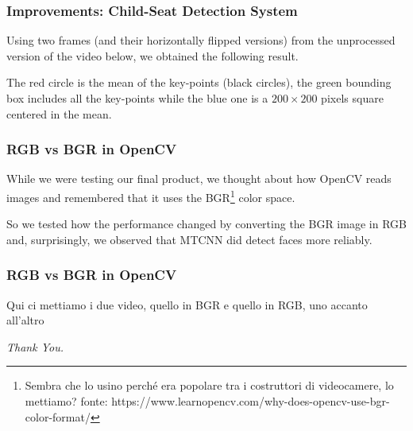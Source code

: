 \documentclass{beamer}
\begin{document}
	\begin{frame}
		\frametitle{Improvements: Child-Seat Detection System}
		Using two frames (and their horizontally flipped versions) from the unprocessed version of the video below, we obtained the following result.
		
		\bigskip
		
		
		The red circle is the mean of the key-points (black circles), the green bounding box includes all the key-points while the blue one is a $200 \times 200$ pixels square centered in the mean.
	\end{frame}

	\begin{frame}
		\frametitle{RGB vs BGR in OpenCV}
		
		While we were testing our final product, we thought about how OpenCV reads images and remembered that it uses the BGR\footnote{Sembra che lo usino perché era popolare tra i costruttori di videocamere, lo mettiamo? fonte: https://www.learnopencv.com/why-does-opencv-use-bgr-color-format/} color space. 
		
		\bigskip
		
		So we tested how the performance changed by converting the BGR image in RGB and, surprisingly, we observed that MTCNN did detect faces more reliably. 
		 

		
	\end{frame}

	\begin{frame}
	\frametitle{RGB vs BGR in OpenCV}
	Qui ci mettiamo i due video, quello in BGR e quello in RGB, uno accanto all'altro
	\end{frame}
	
	\begin{frame}
		\centering \Huge
		\emph{Thank You.}
	\end{frame}
\end{document}
